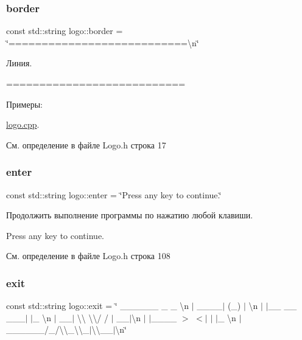 \subsubsection{\texorpdfstring{border}{border}}
{\footnotesize\ttfamily const std\+::string logo\+::border = \char`\"{}===========================\textbackslash{}n\char`\"{}}

Линия. 
\begin{DoxyCode}
===========================
\end{DoxyCode}
 \begin{Desc}
\item[Примеры\+: ]\par
\hyperlink{logo_8cpp-example}{logo.\+cpp}.\end{Desc}


См. определение в файле Logo.\+h строка 17

\mbox{\label{namespacelogo_ac55b3c4624556820a987ccdf67101bae}} 
\subsubsection{\texorpdfstring{enter}{enter}}
{\footnotesize\ttfamily const std\+::string logo\+::enter = \char`\"{}Press any key to continue.\char`\"{}}

Продолжить выполнение программы по нажатию любой клавиши. 
\begin{DoxyCode}
Press any key to \textcolor{keywordflow}{continue}.
\end{DoxyCode}
 

См. определение в файле Logo.\+h строка 108

\mbox{\label{namespacelogo_aba8ca66bcf8abe6a0991a13887671863}} 
\subsubsection{\texorpdfstring{exit}{exit}}
{\footnotesize\ttfamily const std\+::string logo\+::exit = \char`\"{} \+\_\+\+\_\+\+\_\+\+\_\+\+\_\+\+\_\+ \+\_\+ \+\_\+ \textbackslash{}n $\vert$ \+\_\+\+\_\+\+\_\+\+\_\+$\vert$ (\+\_\+) $\vert$ \textbackslash{}n $\vert$ $\vert$\+\_\+\+\_\+ \+\_\+\+\_\+ \+\_\+\+\_\+\+\_\+$\vert$ $\vert$\+\_\+ \textbackslash{}n $\vert$ \+\_\+\+\_\+$\vert$ \textbackslash{}\textbackslash{} \textbackslash{}\textbackslash{}/ / $\vert$ \+\_\+\+\_\+$\vert$\textbackslash{}n $\vert$ $\vert$\+\_\+\+\_\+\+\_\+\+\_\+ $>$ $<$$\vert$ $\vert$ $\vert$\+\_\+ \textbackslash{}n $\vert$\+\_\+\+\_\+\+\_\+\+\_\+\+\_\+\+\_\+/\+\_\+/\textbackslash{}\textbackslash{}\+\_\+\textbackslash{}\textbackslash{}\+\_\+$\vert$\textbackslash{}\textbackslash{}\+\_\+\+\_\+$\vert$\textbackslash{}n\char`\"{}}

